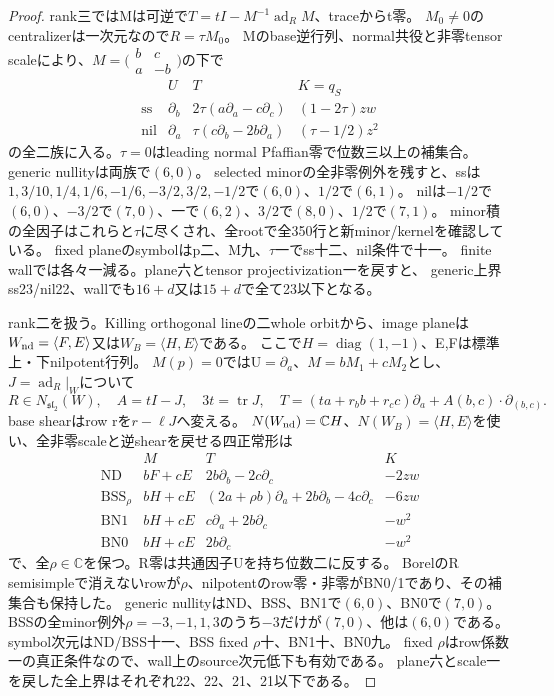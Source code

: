 \documentclass[a4paper,11pt]{ltjsarticle}
\theoremstyle{definition}
\begin{document}
\begin{proof}
rank三ではMは可逆で$T=tI-M^{-1}\operatorname{ad}_RM$、traceからt零。
$M_0\ne0$のcentralizerは一次元なので$R=\tau M_0$。
Mのbase逆行列、normal共役と非零tensor scaleにより、$M=\bigl(\begin{smallmatrix}b&c\\a&-b\end{smallmatrix}\bigr)$の下で
\[
 \begin{array}{c|c|c|c}
 &U&T&K=q_S\\ \hline
 \mathrm{ss}&\partial_b&2\tau(a\partial_a-c\partial_c)&(1-2\tau)zw\\
 \mathrm{nil}&\partial_a&\tau(c\partial_b-2b\partial_a)&(\tau-1/2)z^2
 \end{array}
\]
の全二族に入る。$\tau=0$はleading normal Pfaffian零で位数三以上の補集合。
generic nullityは両族で$(6,0)$。
selected minorの全非零例外を残すと、ssは
$1,3/10,1/4,1/6,-1/6,-3/2,3/2,-1/2$で$(6,0)$、$1/2$で$(6,1)$。
nilは$-1/2$で$(6,0)$、$-3/2$で$(7,0)$、一で$(6,2)$、$3/2$で$(8,0)$、$1/2$で$(7,1)$。
minor積の全因子はこれらと$\tau$に尽くされ、全rootで全350行と新minor/kernelを確認している。
fixed planeのsymbolはp二、M九、$\tau$一でss十二、nil条件で十一。
finite wallでは各々一減る。plane六とtensor projectivization一を戻すと、
generic上界ss23/nil22、wallでも$16+d$又は$15+d$で全て23以下となる。

rank二を扱う。Killing orthogonal lineの二whole orbitから、image planeは
$W_{\rm nd}=\langle F,E\rangle$又は$W_B=\langle H,E\rangle$である。
ここで$H=\operatorname{diag}(1,-1)$、E,Fは標準上・下nilpotent行列。
$M(p)=0$ではU$=\partial_a$、$M=bM_1+cM_2$とし、
$J=\operatorname{ad}_R|_W$について
\[
 R\in N_{\mathfrak{sl}_2}(W),\quad A=tI-J,\quad3t=\operatorname{tr}J,
 \quad T=(ta+r_bb+r_cc)\partial_a+A(b,c)\cdot\partial_{(b,c)}.
\]
base shearはrow rを$r-\ell J$へ変える。
$N(W_{\rm nd})=\mathbb CH$、$N(W_B)=\langle H,E\rangle$を使い、全非零scaleと逆shearを戻せる四正常形は
\[
\begin{array}{c|c|c|c}
 &M&T&K\\ \hline
 \mathrm{ND}&bF+cE&2b\partial_b-2c\partial_c&-2zw\\
 \mathrm{BSS}_\rho&bH+cE&(2a+\rho b)\partial_a+2b\partial_b-4c\partial_c&-6zw\\
 \mathrm{BN1}&bH+cE&c\partial_a+2b\partial_c&-w^2\\
 \mathrm{BN0}&bH+cE&2b\partial_c&-w^2
\end{array}
\]
で、全$\rho\in\mathbb C$を保つ。R零は共通因子Uを持ち位数二に反する。
BorelのR semisimpleで消えないrowが$\rho$、nilpotentのrow零・非零がBN0/1であり、その補集合も保持した。
generic nullityはND、BSS、BN1で$(6,0)$、BN0で$(7,0)$。
BSSの全minor例外$\rho=-3,-1,1,3$のうち$-3$だけが$(7,0)$、他は$(6,0)$である。
symbol次元はND/BSS十一、BSS fixed $\rho$十、BN1十、BN0九。
fixed $\rho$はrow係数一の真正条件なので、wall上のsource次元低下も有効である。
plane六とscale一を戻した全上界はそれぞれ22、22、21、21以下である。


\end{proof}
\end{document}
